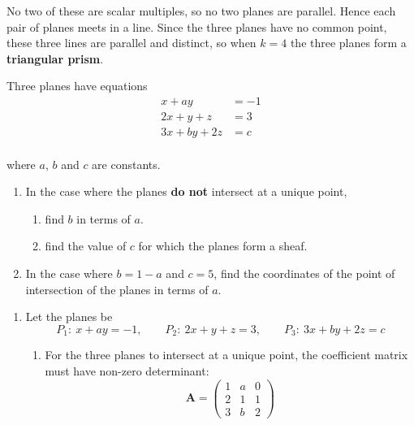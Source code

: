 \documentclass[leqno]{article}
\begin{document}
\begin{enumerate}[
  label=\textbf{\arabic*.},
  leftmargin=*,
  topsep=0pt,
  partopsep=0pt,
  parsep=0pt
]
\begin{djsSolution}
\begin{enumerate}[label=\textbf{(\alph*)}]
No two of these are scalar multiples, so no two planes are parallel. Hence each pair of planes meets in a line. Since the three planes have no common point, these three lines are parallel and distinct, so when \(k=4\) the three planes form a \textbf{triangular prism}.
\end{enumerate} 
\end{djsSolution} 


\newpage

\questionitem

Three planes have equations
\[
\begin{aligned}
x+ay&=-1\\
2x+y+z&=3\\
3x+by+2z&=c
\end{aligned}
\] \\
where $a$, $b$ and $c$ are constants. \\
\begin{enumerate}[label=\textbf{(\alph*)}]
  \item In the case where the planes \textbf{do not} intersect at a unique point,
  \begin{enumerate}[label=(\roman*)]
    \item find $b$ in terms of $a$. 
    \item find the value of $c$ for which the planes form a sheaf.  \\
  \end{enumerate}
  \item In the case where $b=1-a$ and $c=5$, find the coordinates of the point of intersection of the planes in terms of $a$.  \\
\end{enumerate}

\vspace*{10pt}

\begin{djsSolution}
\begin{enumerate}[label=\textbf{(\alph*)}]
  \item Let the planes be
  \[
  P_1:\ x+ay=-1,\qquad
  P_2:\ 2x+y+z=3,\qquad
  P_3:\ 3x+by+2z=c
  \]

  \begin{enumerate}[label=(\roman*)]
    \item For the three planes to intersect at a unique point, the coefficient matrix must have non-zero determinant:
    \[
    \mathbf{A}=
    \begin{pmatrix}
    1 & a & 0\\
    2 & 1 & 1\\
    3 & b & 2
    \end{pmatrix}
    \]


\end{enumerate}
\end{enumerate}
\end{djsSolution}
\end{enumerate}
\end{document}

